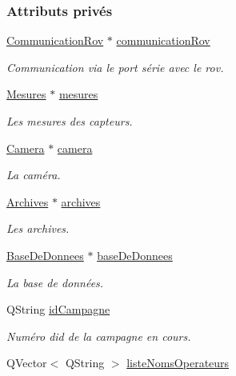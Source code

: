 \subsubsection*{Attributs privés}
\begin{DoxyCompactItemize}
\item 
\hyperlink{class_communication_rov}{Communication\+Rov} $\ast$ \hyperlink{class_rov_a8e7aaa17ee2134f26d57241d11ab2a99}{communication\+Rov}
\begin{DoxyCompactList}\small\item\em Communication via le port série avec le rov. \end{DoxyCompactList}\item 
\hyperlink{class_mesures}{Mesures} $\ast$ \hyperlink{class_rov_af37589b38493e4bd99702587db2d28a8}{mesures}
\begin{DoxyCompactList}\small\item\em Les mesures des capteurs. \end{DoxyCompactList}\item 
\hyperlink{class_camera}{Camera} $\ast$ \hyperlink{class_rov_ad0461ecece812497ee9b4a962f168c18}{camera}
\begin{DoxyCompactList}\small\item\em La caméra. \end{DoxyCompactList}\item 
\hyperlink{class_archives}{Archives} $\ast$ \hyperlink{class_rov_ad41ed46f169f28da226a979f70c4d8a4}{archives}
\begin{DoxyCompactList}\small\item\em Les archives. \end{DoxyCompactList}\item 
\hyperlink{class_base_de_donnees}{Base\+De\+Donnees} $\ast$ \hyperlink{class_rov_a5a9a824cd100947c75d0951eb9e1f90c}{base\+De\+Donnees}
\begin{DoxyCompactList}\small\item\em La base de données. \end{DoxyCompactList}\item 
Q\+String \hyperlink{class_rov_aaaed58cd7ee9edbeab5251cd413a1bae}{id\+Campagne}
\begin{DoxyCompactList}\small\item\em Numéro d\textquotesingle{}id de la campagne en cours. \end{DoxyCompactList}\item 
Q\+Vector$<$ Q\+String $>$ \hyperlink{class_rov_a3d424033e0ff00f480a711358ef4fde6}{liste\+Noms\+Operateurs}

\end{DoxyCompactItemize}
